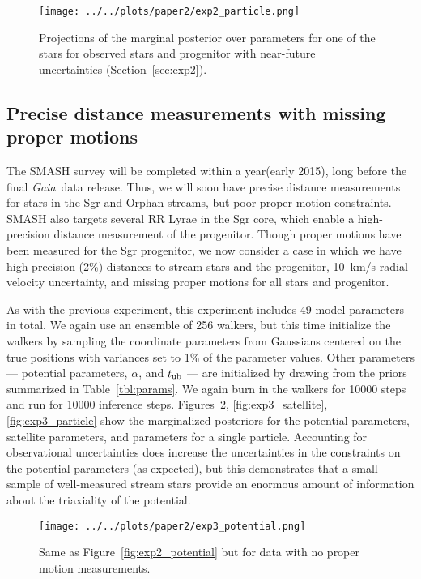 \documentclass[letterpaper,12pt,preprint]{aastex}
\newcommand{\project}[1]{\textsl{#1}}
\newcommand{\gaia}{\project{Gaia}}
\newcommand{\tub}{t_{\rm ub}}
\newcommand{\Loffset}{\alpha}
\begin{document}
\begin{figure}[!ht]
\begin{center}
\texttt{[image: ../../plots/paper2/exp2\_particle.png]}
\caption{ Projections of the marginal posterior over parameters for one of the stars for observed stars and progenitor with near-future uncertainties (Section~\ref{sec:exp2}).   }\label{fig:exp2_particle}
\end{center}
\end{figure}

\subsection{Precise distance measurements with missing proper motions}\label{sec:exp3}
The SMASH survey \citep{smashprop} will be completed within a year(early 2015), long before the final \gaia\, data release. Thus, we will soon have precise distance measurements for stars in the Sgr and Orphan streams, but poor proper motion constraints. SMASH also targets several RR Lyrae in the Sgr core, which enable a high-precision distance measurement of the progenitor. Though proper motions have been measured for the Sgr progenitor, we now consider a case in which we have high-precision (2\%) distances to stream stars and the progenitor, 10~km/s radial velocity uncertainty, and missing proper motions for all stars and progenitor. 

As with the previous experiment, this experiment includes 49 model parameters in total. We again use an ensemble of 256 walkers, but this time initialize the walkers by sampling the coordinate parameters from Gaussians centered on the true positions with variances set to 1\% of the parameter values. Other parameters --- potential parameters, $\Loffset$, and $\tub$ --- are initialized by drawing from the priors summarized in Table~\ref{tbl:params}. We again burn in the walkers for 10000 steps and run for 10000 inference steps. Figures~\ref{fig:exp3_potential}, \ref{fig:exp3_satellite}, \ref{fig:exp3_particle} show the marginalized posteriors for the potential parameters, satellite parameters, and parameters for a single particle. Accounting for observational uncertainties does increase the uncertainties in the constraints on the potential parameters (as expected), but this demonstrates that a small sample of well-measured stream stars provide an enormous amount of information about the triaxiality of the potential.

\begin{figure}[!ht]
\begin{center}
\texttt{[image: ../../plots/paper2/exp3\_potential.png]}
\caption{ Same as Figure~\ref{fig:exp2_potential} but for data with no proper motion measurements. }\label{fig:exp3_potential}
\end{center}
\end{figure}
\end{document}
